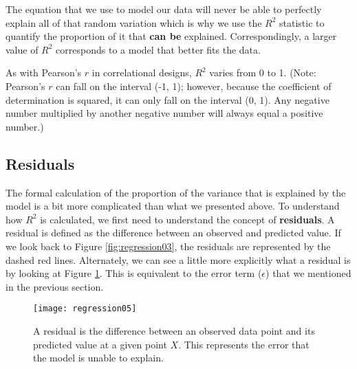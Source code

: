 The equation that we use to model our data will never be able to perfectly explain all of that random variation which is why we use the $R^2$ statistic to quantify the proportion of it that \textbf{can be} explained. Correspondingly, a larger value of $R^2$ corresponds to a model that better fits the data.

As with Pearson's $r$ in correlational designs, $R^2$ varies from 0 to 1. (Note: Pearson's $r$ can fall on the interval (-1, 1); however, because the coefficient of determination is squared, it can only fall on the interval (0, 1). Any negative number multiplied by another negative number will always equal a positive number.)

\subsection{Residuals}

The formal calculation of the proportion of the variance that is explained by the model is a bit more complicated than what we presented above. To understand how $R^2$ is calculated, we first need to understand the concept of \textbf{residuals}. A residual is defined as the difference between an observed and predicted value. If we look back to Figure \ref{fig:regression03}, the residuals are represented by the dashed red lines. Alternately, we can see a little more explicitly what a residual is by looking at Figure \ref{fig:regression05}. This is equivalent to the error term ($\epsilon$) that we mentioned in the previous section.

\begin{figure}[htp]
\texttt{[image: regression05]}
\caption{A residual is the difference between an observed data point and its predicted value at a given point $X$. This represents the error that the model is unable to explain.}
\label{fig:regression05}
\end{figure}

